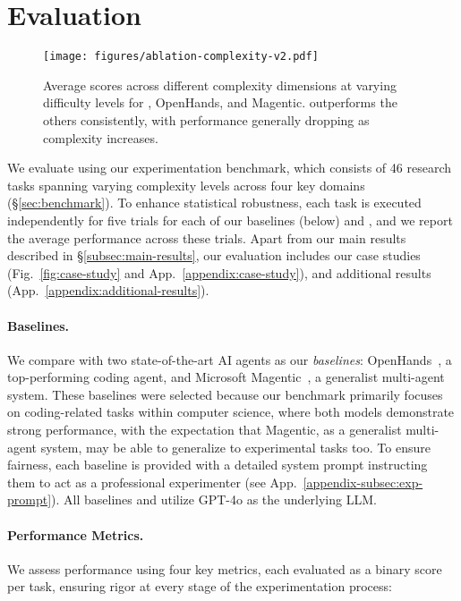 \section{Evaluation}
\label{sec:experiments}


\begin{figure*}[ht]
    \centering
    \texttt{[image: figures/ablation-complexity-v2.pdf]}
    \caption{Average scores across different complexity dimensions at varying difficulty levels for \sys, OpenHands, and Magentic. \sys outperforms the others consistently, with performance generally dropping as complexity increases.}
    \label{fig:ablation-complexity}
\end{figure*}


We evaluate \sys using our experimentation benchmark, which consists of 46 research tasks spanning varying complexity levels across four key domains (\S\ref{sec:benchmark}).
To enhance statistical robustness, each task is executed independently for five trials for each of our baselines (below) and \sys, and we report the average performance across these trials.
Apart from our main results described in \S\ref{subsec:main-results}, our evaluation includes our case studies (Fig.~\ref{fig:case-study} and  App.~\ref{appendix:case-study}), and additional results (App.~\ref{appendix:additional-results}).

\paragraph{Baselines.}
We compare \sys with two state-of-the-art AI agents as our \textit{baselines}: OpenHands~\cite{wang2024openhands}, a top-performing coding agent, and Microsoft Magentic~\cite{fourney2024magentic}, a generalist multi-agent system. 
These baselines were selected because our benchmark primarily focuses on coding-related tasks within computer science, where both models demonstrate strong performance, 
with the expectation that Magentic, as a generalist multi-agent system, may be able to generalize to experimental tasks too.
To ensure fairness, each baseline is provided with a detailed system prompt instructing them to act as a professional experimenter (see App.~\ref{appendix-subsec:exp-prompt}).
All baselines and \sys utilize GPT-4o as the underlying LLM. 

\paragraph{Performance Metrics.}
We assess performance using four key metrics, each evaluated as a binary score per task, ensuring rigor at every stage of the experimentation process:

